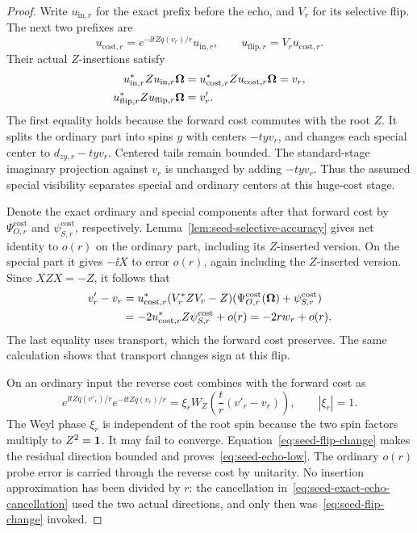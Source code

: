 \begin{proof}
Write \(u_{\mathrm{in},r}\) for the exact prefix before the echo,
and \(V_r\) for its selective flip. The next two prefixes are
\[
 u_{\mathrm{cost},r}=e^{-\ii tZq(v_r)/r}u_{\mathrm{in},r},
 \qquad u_{\mathrm{flip},r}=V_r u_{\mathrm{cost},r}.
\]
Their actual \(Z\)-insertions satisfy
\[
 \begin{aligned}
 u_{\mathrm{in},r}^*Zu_{\mathrm{in},r}\boldsymbol\Omega
 &=u_{\mathrm{cost},r}^*Zu_{\mathrm{cost},r}\boldsymbol\Omega=v_r,\\
 u_{\mathrm{flip},r}^*Zu_{\mathrm{flip},r}\boldsymbol\Omega&=v'_r.
 \end{aligned}
\]
The first equality holds because the forward cost commutes with the
root \(Z\). It splits the ordinary
part into spins \(y\) with centers \(-tyv_r\), and changes each
special center to \(d_{zy,r}-tyv_r\).  Centered tails remain bounded.
The standard-stage imaginary projection against \(v_r\) is unchanged
by adding \(-tyv_r\).  Thus the assumed special visibility separates
special and ordinary centers at this huge-cost stage.

Denote the exact ordinary and special components after that forward
cost by \(\Psi^{\mathrm{cost}}_{O,r}\) and
\(\psi^{\mathrm{cost}}_{S,r}\), respectively.
Lemma~\ref{lem:seed-selective-accuracy}
gives net identity to \(o(r)\) on the ordinary part, including its
\(Z\)-inserted version.  On the special part it gives \(-\ii X\)
to error \(o(r)\), again including the \(Z\)-inserted version.
Since \(XZX=-Z\), it follows that
\begin{align}
 v'_r-v_r
 &=u_{\mathrm{cost},r}^*(V_r^*ZV_r-Z)
      (\Psi^{\mathrm{cost}}_{O,r}(\boldsymbol\Omega)+\psi^{\mathrm{cost}}_{S,r})\notag\\
 &=-2u_{\mathrm{cost},r}^*Z\psi^{\mathrm{cost}}_{S,r}+o(r)
 =-2r w_r+o(r).
\label{eq:seed-flip-change}
\end{align}
The last equality uses transport, which the forward cost preserves.
The same calculation shows that transport changes sign at this flip.

On an ordinary input the reverse cost combines with the forward cost
as
\begin{equation}
\label{eq:seed-exact-echo-cancellation}
 e^{\ii tZq(v'_r)/r}e^{-\ii tZq(v_r)/r}
 =\xi_r W_Z\!\left(\frac{t}{r}(v'_r-v_r)\right),
 \qquad |\xi_r|=1.
\end{equation}
The Weyl phase \(\xi_r\) is independent of the root spin because the
two spin factors multiply to \(Z^2=\mathbf 1\).  It may fail to converge.
Equation~\eqref{eq:seed-flip-change} makes the residual direction
bounded and proves~\eqref{eq:seed-echo-low}.  The ordinary \(o(r)\)
probe error is carried through the reverse cost by unitarity.  No
insertion approximation has been divided by \(r\): the cancellation
in~\eqref{eq:seed-exact-echo-cancellation} used the two actual
directions, and only then was~\eqref{eq:seed-flip-change} invoked.


\end{proof}
